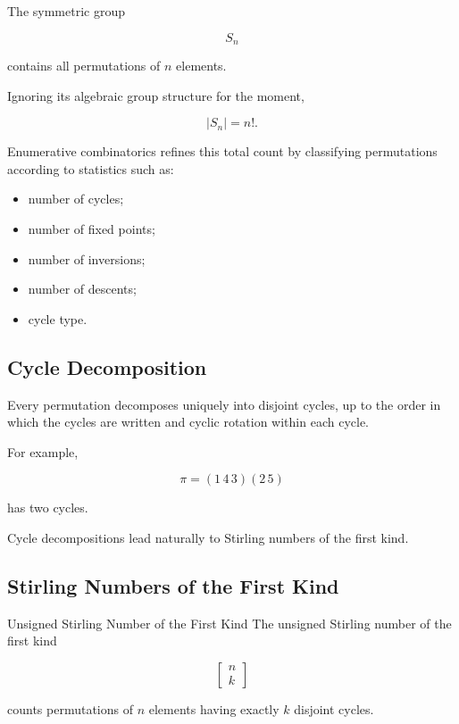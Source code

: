 The symmetric group

\[
S_n
\]

contains all permutations of \(n\) elements.

Ignoring its algebraic group structure for the moment,

\[
\boxed{
|S_n|=n!.
}
\]

Enumerative combinatorics refines this total count by classifying
permutations according to statistics such as:

\begin{itemize}
    \item number of cycles;
    \item number of fixed points;
    \item number of inversions;
    \item number of descents;
    \item cycle type.
\end{itemize}

\subsection{Cycle Decomposition}
\label{subsec:permutation-cycle-decomposition}

Every permutation decomposes uniquely into disjoint cycles, up to the
order in which the cycles are written and cyclic rotation within each
cycle.

For example,

\[
\pi
=
(1\,4\,3)(2\,5)
\]

has two cycles.

Cycle decompositions lead naturally to Stirling numbers of the first
kind.

\subsection{Stirling Numbers of the First Kind}
\label{subsec:stirling-first-kind}

\begin{definitionbox}{Unsigned Stirling Number of the First Kind}
The unsigned Stirling number of the first kind

\[
\boxed{
\left[
\begin{matrix}
n\\
k
\end{matrix}
\right]
}
\]

counts permutations of \(n\) elements having exactly \(k\) disjoint
cycles.
\end{definitionbox}

